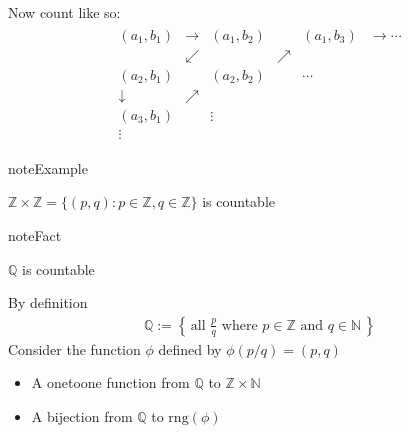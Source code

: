 \documentclass[letterpaper,10pt,english]{jupyterBook}
\begin{document}
\sphinxAtStartPar
Now count like so:
\begin{equation*}
\begin{split}
\begin{matrix}
(a_{1},b_{1})&\to &(a_{1},b_{2})&       & (a_{1},b_{3})&\to\cdots\\
&\swarrow&             &\nearrow   &              & \\
(a_{2},b_{1})&    &(a_{2},b_{2})&       &\cdots        & \\
\downarrow   &\nearrow&             &       &              & \\
(a_{3},b_{1})&    &\vdots       &       &              & \\
\vdots       &    &             &       &              & 
\end{matrix}
\end{split}
\end{equation*}
\begin{sphinxadmonition}{note}{Example}

\sphinxAtStartPar
\(\mathbb{Z} \times \mathbb{Z} = \{ (p,q) : p \in \mathbb{Z}, q \in \mathbb{Z} \}\) is countable
\end{sphinxadmonition}

\begin{figure}[htbp]
\centering

\noindent{}
\end{figure}

\begin{sphinxadmonition}{note}{Fact}

\sphinxAtStartPar
\(\mathbb{Q}\) is countable
\end{sphinxadmonition}

\sphinxAtStartPar
{} By definition
\begin{equation*}
\begin{split}
\mathbb{Q}:= 
\left\{ \, 
\text{all } \frac{p}{q}
\text{ where } p \in \mathbb{Z} \text{ and }  q \in \mathbb{N} \,
\right\}
\end{split}
\end{equation*}
\sphinxAtStartPar
Consider the function \(\phi\) defined by \(\phi(p/q) = (p, q)\)
\begin{itemize}
\item {} 
\sphinxAtStartPar
A one\sphinxhyphen{}to\sphinxhyphen{}one function from \(\mathbb{Q}\) to \(\mathbb{Z} \times \mathbb{N}\)

\item {} 
\sphinxAtStartPar
A bijection from \(\mathbb{Q}\) to \(\mathrm{rng}(\phi)\)

\end{itemize}
\end{document}
